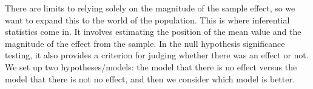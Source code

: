 \documentclass{ltjbook}
\begin{document}
There are limits to relying solely on the magnitude of the sample effect, so we want to expand this to the world of the population. This is where inferential statistics come in. It involves estimating the position of the mean value and the magnitude of the effect from the sample.
In the null hypothesis significance testing, it also provides a criterion for judging whether there was an effect or not. We set up two hypotheses/models: the model that there is no effect versus the model that there is not no effect, and then we consider which model is better.
\end{document}
